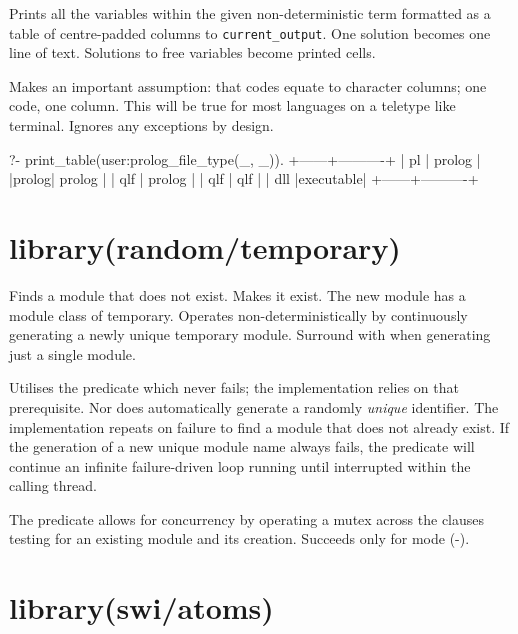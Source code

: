 \begin{description}
Prints all the variables within the given non-deterministic 
term formatted as a table of centre-padded columns to
\verb$current_output$. One  solution becomes one line of text.
Solutions to free variables become printed cells.

Makes an important assumption: that codes equate to character
columns; one code, one column. This will be true for most languages
on a teletype like terminal. Ignores any exceptions by design.

\begin{code}
?- print_table(user:prolog_file_type(_, _)).
+------+----------+
|  pl  |  prolog  |
|prolog|  prolog  |
| qlf  |  prolog  |
| qlf  |   qlf    |
| dll  |executable|
+------+----------+
\end{code}

\end{description}

\chapter{library(random/temporary)}\label{sec:temporary}

\begin{description}
Finds a module that does not exist. Makes it exist. The new module
has a module class of temporary. Operates non-deterministically by
continuously generating a newly unique temporary module. Surround
with  when generating just a single module.

Utilises the  predicate which never fails; the implementation
relies on that prerequisite. Nor does  automatically generate
a randomly \textit{unique} identifier. The implementation repeats on
failure to find a module that does not already exist. If the
generation of a new unique module name always fails, the predicate
will continue an infinite failure-driven loop running until
interrupted within the calling thread.

The predicate allows for concurrency by operating a mutex across the
clauses testing for an existing module and its creation. Succeeds
only for mode (-).
\end{description}

\chapter{library(swi/atoms)}\label{sec:atoms}

